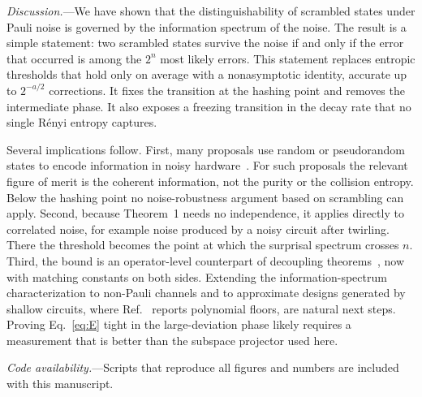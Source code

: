 \documentclass[aps,prl,twocolumn,superscriptaddress,amsmath,amssymb,10pt]{revtex4-2}
\begin{document}
\emph{Discussion.}---We have shown that the distinguishability of scrambled states under Pauli noise is governed by the information spectrum of the noise. The result is a simple statement: two scrambled states survive the noise if and only if the error that occurred is among the $2^n$ most likely errors. This statement replaces entropic thresholds that hold only on average with a nonasymptotic identity, accurate up to $2^{-a/2}$ corrections. It fixes the transition at the hashing point and removes the intermediate phase. It also exposes a freezing transition in the decay rate that no single R\'enyi entropy captures.

Several implications follow. First, many proposals use random or pseudorandom states to encode information in noisy hardware~\cite{Bansal,Arute,Morvan}. For such proposals the relevant figure of merit is the coherent information, not the purity or the collision entropy. Below the hashing point no noise-robustness argument based on scrambling can apply. Second, because Theorem~1 needs no independence, it applies directly to correlated noise, for example noise produced by a noisy circuit after twirling. There the threshold becomes the point at which the surprisal spectrum crosses $n$. Third, the bound is an operator-level counterpart of decoupling theorems~\cite{Dupuis,HaydenPreskill}, now with matching constants on both sides. Extending the information-spectrum characterization to non-Pauli channels and to approximate designs generated by shallow circuits, where Ref.~\cite{Liu2026} reports polynomial floors, are natural next steps. Proving Eq.~\eqref{eq:E} tight in the large-deviation phase likely requires a measurement that is better than the subspace projector used here.

\emph{Code availability.}---Scripts that reproduce all figures and numbers are included with this manuscript.
\end{document}
